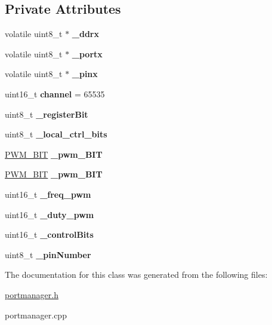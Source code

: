 \subsection*{Private Attributes}
\begin{DoxyCompactItemize}
\item 
\mbox{\label{classPin_a07ee57af89974777d3839df8a13e1791}} 
volatile uint8\+\_\+t $\ast$ {\bfseries \+\_\+ddrx}
\item 
\mbox{\label{classPin_a6bad8a39ce0aece01804bf34474a8a24}} 
volatile uint8\+\_\+t $\ast$ {\bfseries \+\_\+portx}
\item 
\mbox{\label{classPin_ad36da0eaefb41596bb204bbe489c5599}} 
volatile uint8\+\_\+t $\ast$ {\bfseries \+\_\+pinx}
\item 
\mbox{\label{classPin_a38f8a9dd584cf216ab48f4524b6f7808}} 
uint16\+\_\+t {\bfseries channel} = 65535
\item 
\mbox{\label{classPin_abd8ffe1c180d2e91cae0567bd7562192}} 
uint8\+\_\+t {\bfseries \+\_\+register\+Bit}
\item 
\mbox{\label{classPin_a58fa22db3e90c1a048446df1fa0781c9}} 
uint8\+\_\+t {\bfseries \+\_\+local\+\_\+ctrl\+\_\+bits}
\item 
\mbox{\label{classPin_a948a3306a825241abc9634e7d477511a}} 
\hyperlink{structPWM__16BIT}{P\+W\+M\+\_\+B\+IT} {\bfseries \+\_\+pwm\+\_\+B\+IT}
\item 
\mbox{\label{classPin_a94fc11a6e7aea0f84844b8b3627c38b6}} 
\hyperlink{structPWM__8BIT}{P\+W\+M\+\_\+B\+IT} {\bfseries \+\_\+pwm\+\_\+B\+IT}
\item 
\mbox{\label{classPin_a8c83fc94d50888134e19fd3c30fc8184}} 
uint16\+\_\+t {\bfseries \+\_\+freq\+\_\+pwm}
\item 
\mbox{\label{classPin_a0b0f93214d2c2fd6df6e94b931a63674}} 
uint16\+\_\+t {\bfseries \+\_\+duty\+\_\+pwm}
\item 
\mbox{\label{classPin_ad1b2636ee51b9eea404113295a17e2d7}} 
uint16\+\_\+t {\bfseries \+\_\+control\+Bits}
\item 
\mbox{\label{classPin_ae83866782be29ac99476647e3ef26f40}} 
uint8\+\_\+t {\bfseries \+\_\+pin\+Number}
\end{DoxyCompactItemize}


The documentation for this class was generated from the following files\+:\begin{DoxyCompactItemize}
\item 
\hyperlink{portmanager_8h}{portmanager.\+h}\item 
portmanager.\+cpp\end{DoxyCompactItemize}
